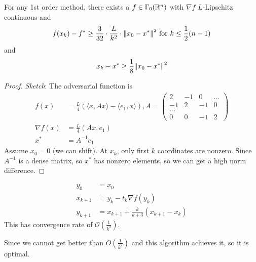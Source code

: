 \documentclass[class=article,crop=false]{standalone}
\begin{document}
\begin{thm}[Nesterov 1983]
	For any 1st order method, there exists a $ f \in \Gamma_0(\mathbb{R}^{n})$ with $ \nabla f$ $L$-Lipschitz continuous and \[ f(x_k)-f^*  \geq \frac{3}{32} \cdot \frac{L}{k^2} \cdot {\left\lVert{ x_0-x^* }\right\rVert}^2 \text{ for } k\leq \frac{1}{2}(n-1)  \] and \[x_k - x^* \geq \frac{1}{8} {\left\lVert{ x_0 - x^* }\right\rVert}^2 \]
\end{thm}
\begin{proof}
\emph{Sketch}: The adversarial function is
\begin{align*}
	f(x) &= \frac{L}{4} \left( \langle x,Ax \rangle - \langle e_1,x \rangle \right), A= \begin{pmatrix} 2&-1&0&\ldots\\-1&2&-1&0\\ \ldots\\0&0&-1&2 \end{pmatrix}\\
	\nabla f(x) &= \frac{L}{4} (Ax, e_1)\\
	x^* &= A^{-1} e_1
\end{align*}
Assume $ x_0 = 0$ (we can shift). At $ x_k$, only first $ k$ coordinates are nonzero. Since  $ A^{-1}$ is a dense matrix, so $ x^* $ has nonzero elements, so we can get a high norm difference.
\end{proof}

\begin{thm}[Nesterov]
\begin{align*}
	y_0 &= x_0\\
	x_{k+1} &= y_k-t_k \nabla f(y_k)\\
	y_{k+1} & = x_{k+1} + \frac{k}{k+3} (x_{k+1}-x_k)
\end{align*}
This has convergence rate of $ \mathcal{ O}\left(\frac{1}{k^2}\right)$.
\end{thm}
\begin{remark}
	Since we cannot get better than $ O\left( \frac{1}{k^2} \right) $ and this algorithm achieves it, so it is optimal.
\end{remark}
\end{document}
